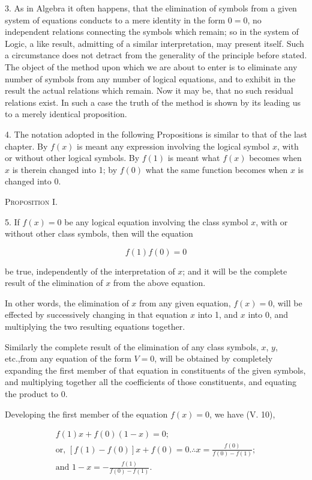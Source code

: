 \documentclass[oneside]{book}
\begin{document}
3. As in Algebra it often happens, that the elimination of
symbols from a given system of equations conducts to a mere
identity in the form $0 = 0$, no independent relations connecting
the symbols which remain; so in the system of Logic, a like result,
admitting of a similar interpretation, may present itself.
Such a circumstance does not detract from the generality of
the principle before stated. The object of the method upon
which we are about to enter is to eliminate any number of symbols
from any number of logical equations, and to exhibit in the
result the actual relations which remain. Now it may be, that
no such residual relations exist. In such a case the truth of the
method is shown by its leading us to a merely identical proposition.

4. The notation adopted in the following Propositions is
similar to that of the last chapter. By $f(x)$ is meant any expression
involving the logical symbol $x$, with or without other
logical symbols. By $f(1)$ is meant what $f(x)$ becomes when $x$
is therein changed into 1; by $f(0)$ what the same function becomes
when $x$ is changed into 0.

\begin{center}
\textsc{Proposition I}.
\end{center}

5. If $f(x)=0$ be any logical equation involving the class symbol
$x$, with or without other class symbols, then will the equation

\[
f(1)f(0)=0
\]

be true, independently of the interpretation of $x$; and it will be the complete result of the elimination of $x$ from the above equation.

In other words, the elimination of $x$ from any given equation,
$f(x)=0$, will be effected by successively changing in that equation $x$ into 1, and $x$ into 0, and multiplying the two resulting equations together.

Similarly the complete result of the elimination of any class symbols, $x$, $y$, etc.,from any equation of the form $V=0$, will be obtained
by completely expanding the first member of that equation in constituents of the given symbols, and multiplying together all the coefficients of those constituents, and equating the product to 0.

Developing the first member of the equation $f(x)=0$, we
have (V. 10),

\begin{eqnarray}
f(1)x+f(0)(1-x)=0;\nonumber \\
\textrm{or, }
[f(1)-f(0)]x+f(0)=0.
\therefore x=\frac{f(0)}{f(0)-f(1)}; \nonumber\\
\textrm{and }
1-x=-\frac{f(1)}{f(0)-f(1)}.\nonumber
\end{eqnarray}
\end{document}
